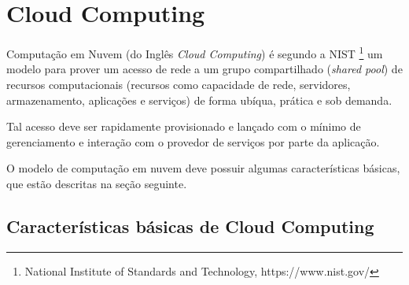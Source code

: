 	\section{Cloud Computing}
	Computação em Nuvem (do Inglês \textit{Cloud Computing}) é segundo a NIST \footnote{National Institute of Standards and Technology, https://www.nist.gov/} um modelo para prover um acesso de rede a um grupo compartilhado (\textit{shared pool}) de recursos computacionais (recursos como capacidade de rede, servidores, armazenamento, aplicações e serviços) de forma ubíqua, prática e sob demanda.

Tal acesso deve ser rapidamente provisionado e lançado com o mínimo de gerenciamento e interação com o provedor de serviços por parte da aplicação.

O modelo de computação em nuvem deve possuir algumas características básicas, que estão descritas na seção seguinte.

\subsection{Características básicas de Cloud Computing}

